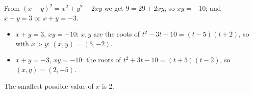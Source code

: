 From $(x+y)^2=x^2+y^2+2xy$ we get $9=29+2xy$, so $xy=-10$; and $x+y=3$ or $x+y=-3$.
\begin{itemize}
\item $x+y=3$, $xy=-10$: $x,y$ are the roots of $t^2-3t-10=(t-5)(t+2)$, so with $x>y$: $(x,y)=(5,-2)$.
\item $x+y=-3$, $xy=-10$: the roots of $t^2+3t-10=(t+5)(t-2)$, so $(x,y)=(2,-5)$.
\end{itemize}
The smallest possible value of $x$ is $\boxed{2}$.
